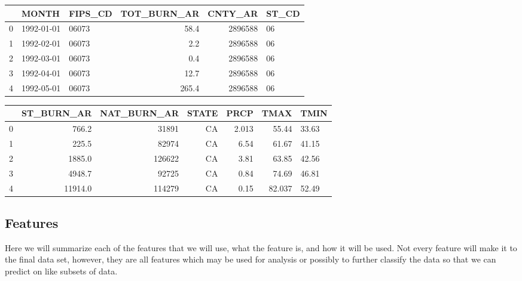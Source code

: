 \documentclass[12pt]{article}
\begin{document}
\begin{center}
\begin{tabular}{lllrrl}
\toprule 
{} & MONTH & FIPS\_CD &  TOT\_BURN\_AR &  CNTY\_AR & ST\_CD \\
\midrule
0 & 1992-01-01 &     06073 &             58.4 &    2896588 & 06 \\ 
1 & 1992-02-01 &     06073 &              2.2 &    2896588 & 06  \\
2 & 1992-03-01 &     06073 &              0.4 &    2896588 & 06 \\ 
3 & 1992-04-01 &     06073 &             12.7 &    2896588 & 06  \\
4 & 1992-05-01 &     06073 &            265.4 &    2896588 & 06 \\
\bottomrule
\end{tabular}

\begin{tabular}{lrrrrrl}
\toprule 
{} & ST\_BURN\_AR &  NAT\_BURN\_AR & STATE &      PRCP &       TMAX &       TMIN \\
\midrule
0 &  766.2 &           31891 &    CA &  2.013 &  55.44 &  33.63 \\ 
1 &  225.5 &           82974 &    CA &  6.54 &  61.67 &  41.15 \\
2 & 1885.0 &          126622 &    CA &  3.81 &  63.85 &  42.56 \\ 
3 &  4948.7 &           92725 &    CA &  0.84 &  74.69 &  46.81 \\
4 & 11914.0 &          114279 &    CA &  0.15 &  82.037 &  52.49 \\ 
\bottomrule
\end{tabular}

\end{center}

\subsection{\textrm{Features}}

Here we will summarize each of the features that we will use, what the feature is, and how it will be used. Not every feature will make it to the final data set, however, they are all features which may be used for analysis or possibly to further classify the data so that we can predict on like subsets of data. 
\end{document}
